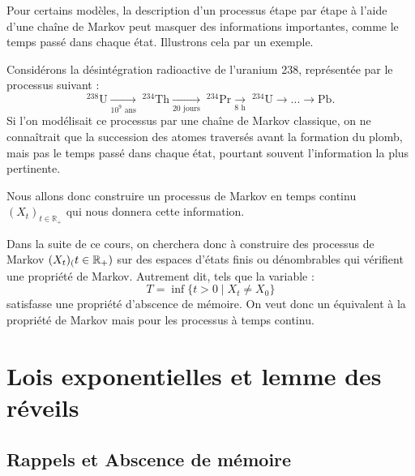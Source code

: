 \minitoc 


Pour certains modèles, la description d'un processus étape par étape à l'aide d'une chaîne de Markov 
peut masquer des informations importantes, comme le temps passé dans chaque état. Illustrons cela par un exemple.

\begin{example}
    Considérons la désintégration radioactive de l'uranium 238, représentée par le processus suivant : 
        \[
            ^{238}\mathrm{U} \underset{10^9 \text{ ans}}{\longrightarrow} \; ^{234}\mathrm{Th} 
            \underset{20 \text{ jours}}{\longrightarrow} \; ^{234}\mathrm{Pr} 
            \underset{8 \text{ h}}{\longrightarrow} \; ^{234}\mathrm{U} \longrightarrow ... \longrightarrow \mathrm{Pb}.
        \]
    Si l'on modélisait ce processus par une chaîne de Markov classique, on ne connaîtrait que la succession des atomes traversés avant la formation du plomb, mais pas le temps passé dans chaque état, pourtant souvent l'information la plus pertinente.  

    Nous allons donc construire un processus de Markov en temps continu \((X_t)_{t \in \mathbb{R}_+}\) 
    qui nous donnera cette information.
\end{example}

Dans la suite de ce cours, on cherchera donc à construire des processus de Markov $(X_t)_(t \in \mathbb{R}_+)$ 
sur des espaces d'états finis ou dénombrables qui vérifient une propriété de Markov. Autrement dit, tels que la variable : 
    $$ T = \inf \{t > 0 \mid X_t \not = X_0\} $$ 
satisfasse une propriété d'abscence de mémoire. On veut donc un équivalent à la propriété de Markov 
mais pour les processus à temps continu. 


\section{Lois exponentielles et lemme des réveils}

\subsection{Rappels et Abscence de mémoire}

